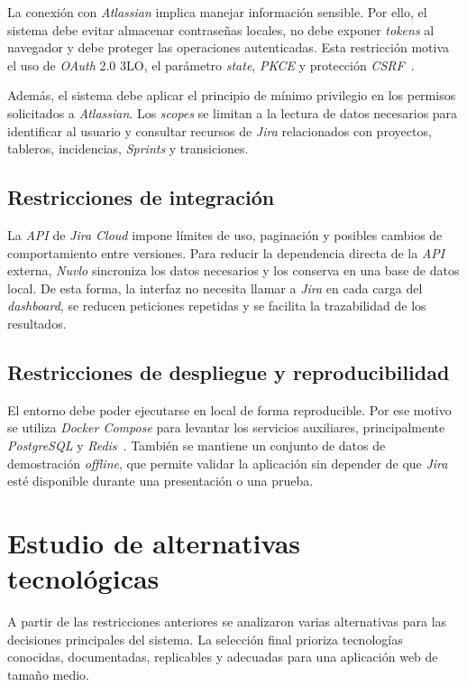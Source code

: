 La conexión con \textit{Atlassian} implica manejar información sensible. Por ello, el sistema debe evitar almacenar contraseñas locales, no debe exponer \textit{tokens} al navegador y debe proteger las operaciones autenticadas. Esta restricción motiva el uso de \textit{OAuth} 2.0 3LO, el parámetro \textit{state}, \textit{PKCE} y protección \textit{CSRF}~\cite{AtlassianOAuth3LO,OWASPOAuth2,OWASPCSRF}.

Además, el sistema debe aplicar el principio de mínimo privilegio en los permisos solicitados a \textit{Atlassian}. Los \textit{scopes} se limitan a la lectura de datos necesarios para identificar al usuario y consultar recursos de \textit{Jira} relacionados con proyectos, tableros, incidencias, \textit{Sprints} y transiciones.

\subsection{Restricciones de integración}

La \textit{API} de \textit{Jira Cloud} impone límites de uso, paginación y posibles cambios de comportamiento entre versiones. Para reducir la dependencia directa de la \textit{API} externa, \textit{Nuvlo} sincroniza los datos necesarios y los conserva en una base de datos local. De esta forma, la interfaz no necesita llamar a \textit{Jira} en cada carga del \textit{dashboard}, se reducen peticiones repetidas y se facilita la trazabilidad de los resultados.

\subsection{Restricciones de despliegue y reproducibilidad}

El entorno debe poder ejecutarse en local de forma reproducible. Por ese motivo se utiliza \textit{Docker Compose} para levantar los servicios auxiliares, principalmente \textit{PostgreSQL} y \textit{Redis}~\cite{DockerComposeDocs}. También se mantiene un conjunto de datos de demostración \textit{offline}, que permite validar la aplicación sin depender de que \textit{Jira} esté disponible durante una presentación o una prueba.

\section{Estudio de alternativas tecnológicas}

A partir de las restricciones anteriores se analizaron varias alternativas para las decisiones principales del sistema. La selección final prioriza tecnologías conocidas, documentadas, replicables y adecuadas para una aplicación web de tamaño medio.

